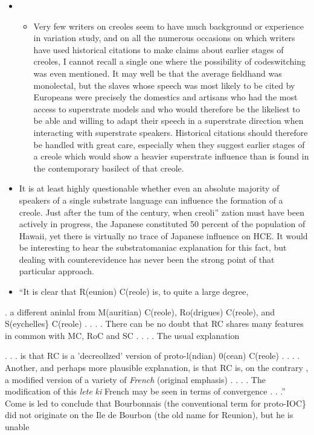 \begin{itemize}
\item %
\begin{itemize}
\item Very few writers on creoles seem to have much background or experience in variation study, and on all the numerous occasions on which writers have used historical citations to make claims about earlier stages of creoles, I cannot recall a single one where the possi\-bility of codeswitching was even mentioned. It may well be that the average fieldhand was monolectal, but the slaves whose speech was most likely to be cited by Europeans were precisely the domestics and artisans who had the most access to superstrate models and who would therefore be the likeliest to be able and willing to adapt their speech in a superstrate direction when interacting with superstrate speakers. Historical citations should therefore be handled with great care, especially when they suggest earlier stages of a creole which would show a heavier superstrate influence than is found in the con\-temporary basilect of that creole.
\end{itemize}
\end{itemize}
\begin{itemize}
\item It is at least highly questionable whether even an absolute majority of speakers of a single substrate language can influence the formation of a creole. Just after the tum of the century, when creoli'' zation must have been actively in progress, the Japanese constituted 50 percent of the population of Hawaii, yet there is virtually no trace of Japanese influence on HCE. It would be interesting to hear the substratomaniac explanation for this fact, but dealing with counter\-evidence has never been the strong point of that particular approach.
\item ``It is clear that R(eunion) C(reole) is, to quite a large degree,
\end{itemize}

. a different aninlal from M(auritian) C(reole), Ro(drigues) C(reole), and S(eychelles\} C(reole) . . . . There can be no doubt that RC shares many features in common with MC, RoC and SC . . . . The usual explanation

. . . is that RC is a 'decreollzed' version of proto-l(ndian) 0(cean) C(reole) . . . . Another, and perhaps more plausible explanation, is that RC is, on the contrary , a modified version of a variety of \textit{French} (original emphasis) . . . . The modification of this \textit{lete} \textit{ki} French may be seen in terms of convergence . . .'' Come is led to conclude that Bourbonnais (the conventional term for proto-IOC\} did not originate on the Ile de Bourbon (the old name for Reunion), but he is unable

